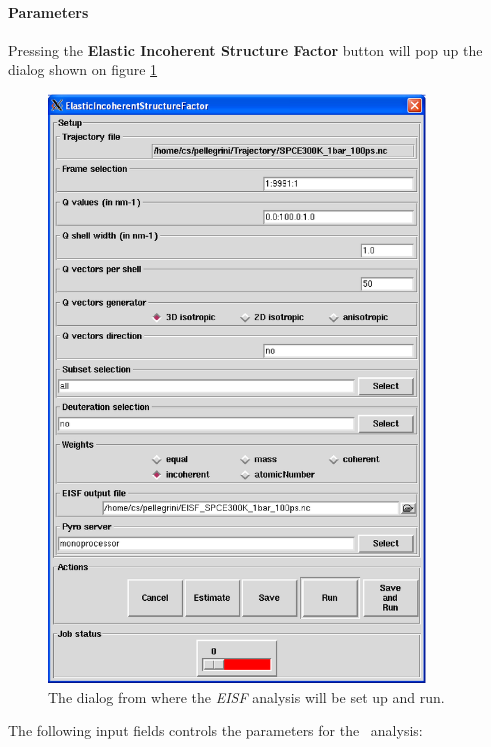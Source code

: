\documentclass[a4paper,11pt]{report}
\begin{document}
\paragraph{Parameters\\}
\label{eisf_parameters}
Pressing the \textbf{Elastic Incoherent Structure Factor} button will pop up the dialog shown on figure \ref{fig:eisf}
\begin{figure}[h!]
\begin{center}
\includegraphics[width=10cm]{Figures/eisf.eps}
\end{center}
\caption[The \textit{EISF} analysis dialog]{The dialog from where the \textit{EISF} analysis will be set up and run.}
\label{fig:eisf}
\end{figure}   

The following input fields controls the parameters for the \EISF\ analysis:
\end{document}
